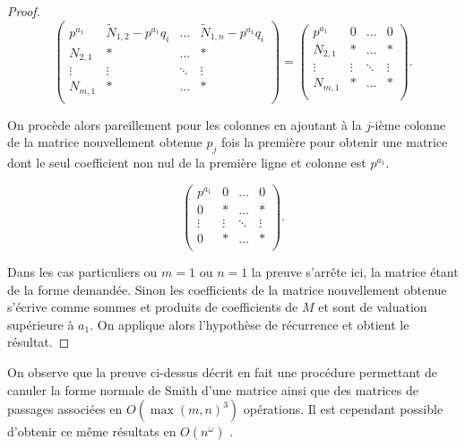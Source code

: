 \begin{proof}
	\[
 		\begin{pmatrix} p^{a_1}  & \tilde{N}_{1,2}- p^{a_1}  q_{i} & \ldots & \tilde{N}_{1,n}- p^{a_1}  q_{i} \\
			N_{2,1} & * & \ldots & *\\
			\vdots & \vdots & \ddots & \vdots \\
			N_{m,1} &* & \ldots & *\\
		\end{pmatrix} 
 = 		\begin{pmatrix} p^{a_1}& 0 & \ldots & 0 \\
			N_{2,1} & * & \ldots & *\\
			\vdots & \vdots & \ddots & \vdots \\
			N_{m,1} &* & \ldots & *\\
		\end{pmatrix} 
	.\] 

On procède alors pareillement pour les colonnes en ajoutant à la $j$-ième colonne de la matrice nouvellement obtenue $p_{j}$ fois la première pour obtenir une matrice dont le seul coefficient non nul de la première ligne et colonne est $p^{a_1}$.

	\[ 		\begin{pmatrix}  p^{a_1}& 0 & \ldots & 0 \\
			0 & * & \ldots & *\\
			\vdots & \vdots & \ddots & \vdots \\
			0 &* & \ldots & *\\
		\end{pmatrix} 
	.\] 

Dans les cas particuliers ou $m = 1$ ou $n=1$ la preuve s'arrête ici, la matrice étant de la forme demandée. 
Sinon les coefficients de la matrice nouvellement obtenue s'écrive comme sommes et produits de coefficients de $M$ et sont de valuation supérieure à $a_1$. On applique alors l'hypothèse de récurrence et obtient le résultat.
	\end{proof}

	\begin{remarques}
		On observe que la preuve ci-dessus décrit en fait une procédure permettant de canuler la forme normale de Smith d'une matrice ainsi que des matrices de passages associées en $O\left( \max\left( m,n \right) ^3 \right) $ opérations. Il est cependant possible d'obtenir ce même résultats en $O(n^{ \omega}) $  .
	\end{remarques}



